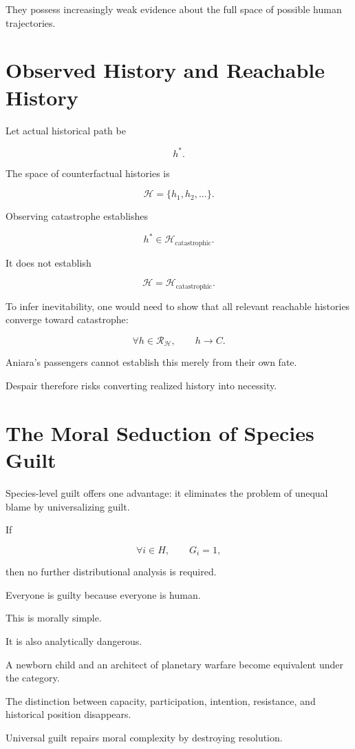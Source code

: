\documentclass[11pt,oneside]{book}
\theoremstyle{definition}
\theoremstyle{remark}
\newcommand{\R}{\mathcal{R}}
\begin{document}
They possess increasingly weak evidence about the full space of possible human trajectories.

\section{Observed History and Reachable History}

Let actual historical path be

\[
h^\ast.
\]

The space of counterfactual histories is

\[
\mathcal H
=
\{h_1,h_2,\ldots\}.
\]

Observing catastrophe establishes

\[
h^\ast\in\mathcal H_{\mathrm{catastrophic}}.
\]

It does not establish

\[
\mathcal H
=
\mathcal H_{\mathrm{catastrophic}}.
\]

To infer inevitability, one would need to show that all relevant reachable histories converge toward catastrophe:

\[
\forall h\in\R_{\mathcal H},
\qquad
h\rightarrow C.
\]

Aniara's passengers cannot establish this merely from their own fate.

Despair therefore risks converting realized history into necessity.

\section{The Moral Seduction of Species Guilt}

Species-level guilt offers one advantage: it eliminates the problem of unequal blame by universalizing guilt.

If

\[
\forall i\in H,
\qquad
G_i=1,
\]

then no further distributional analysis is required.

Everyone is guilty because everyone is human.

This is morally simple.

It is also analytically dangerous.

A newborn child and an architect of planetary warfare become equivalent under the category.

The distinction between capacity, participation, intention, resistance, and historical position disappears.

Universal guilt repairs moral complexity by destroying resolution.
\end{document}
